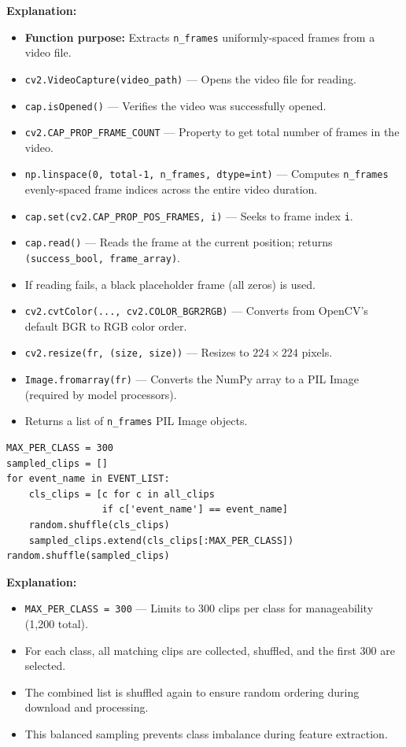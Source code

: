 \documentclass[a4paper, 12pt]{article}
\newenvironment{explanation}{%
  \par\smallskip
  \noindent\textcolor{blue!70!black}{\textbf{Explanation:}}\\
  \noindent
}{\par\medskip}
\begin{document}
\begin{explanation}
\begin{itemize}[nosep]
  \item \textbf{Function purpose:} Extracts \texttt{n\_frames} uniformly-spaced frames from a video file.
  \item \texttt{cv2.VideoCapture(video\_path)} --- Opens the video file for reading.
  \item \texttt{cap.isOpened()} --- Verifies the video was successfully opened.
  \item \texttt{cv2.CAP\_PROP\_FRAME\_COUNT} --- Property to get total number of frames in the video.
  \item \texttt{np.linspace(0, total-1, n\_frames, dtype=int)} --- Computes \texttt{n\_frames} evenly-spaced frame indices across the entire video duration.
  \item \texttt{cap.set(cv2.CAP\_PROP\_POS\_FRAMES, i)} --- Seeks to frame index \texttt{i}.
  \item \texttt{cap.read()} --- Reads the frame at the current position; returns \texttt{(success\_bool, frame\_array)}.
  \item If reading fails, a black placeholder frame (all zeros) is used.
  \item \texttt{cv2.cvtColor(..., cv2.COLOR\_BGR2RGB)} --- Converts from OpenCV's default BGR to RGB color order.
  \item \texttt{cv2.resize(fr, (size, size))} --- Resizes to $224 \times 224$ pixels.
  \item \texttt{Image.fromarray(fr)} --- Converts the NumPy array to a PIL Image (required by model processors).
  \item Returns a list of \texttt{n\_frames} PIL Image objects.
\end{itemize}
\end{explanation}

\begin{lstlisting}
MAX_PER_CLASS = 300
sampled_clips = []
for event_name in EVENT_LIST:
    cls_clips = [c for c in all_clips
                 if c['event_name'] == event_name]
    random.shuffle(cls_clips)
    sampled_clips.extend(cls_clips[:MAX_PER_CLASS])
random.shuffle(sampled_clips)
\end{lstlisting}

\begin{explanation}
\begin{itemize}[nosep]
  \item \texttt{MAX\_PER\_CLASS = 300} --- Limits to 300 clips per class for manageability (1,200 total).
  \item For each class, all matching clips are collected, shuffled, and the first 300 are selected.
  \item The combined list is shuffled again to ensure random ordering during download and processing.
  \item This balanced sampling prevents class imbalance during feature extraction.
\end{itemize}
\end{explanation}
\end{document}
